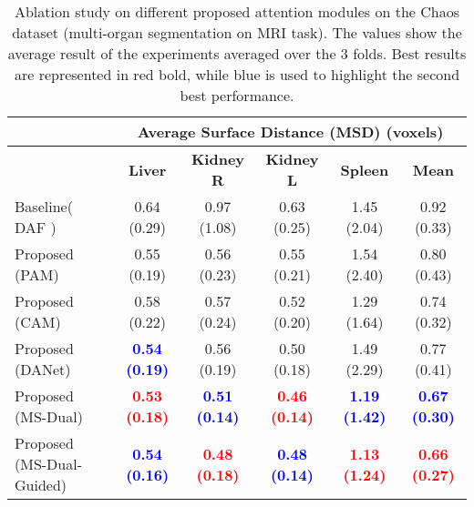 \documentclass[journal]{IEEEtran}
\begin{document}
\begin{table*}[ht!]
\begin{tabular}{lcccc|c}
\midrule
& \multicolumn{5}{c}{\textbf{Average Surface Distance (MSD)} (voxels)}\\
 \midrule
 & \textbf{Liver} & \textbf{Kidney R} & \textbf{Kidney L} & \textbf{Spleen} & \textbf{Mean}  \\
 \midrule
Baseline( DAF \cite{wang18d})  & 0.64 (0.29) & 0.97 (1.08) & 0.63 (0.25)& 1.45 (2.04)&  0.92 (0.33)  \\
Proposed (PAM)     & 0.55 (0.19)& 0.56 (0.23)& 0.55 (0.21)& 1.54 (2.40)&  0.80 (0.43) \\
Proposed (CAM)     &  0.58 (0.22)& 0.57 (0.24)& 0.52 (0.20)& 1.29 (1.64)  & 0.74 (0.32)\\
Proposed (DANet) & \textcolor{blue}{\textbf{0.54 (0.19)}}  &0.56 (0.19) & 0.50 (0.18)& 1.49 (2.29)&   0.77 (0.41) \\
Proposed (MS-Dual)  & \textcolor{red}{\textbf{0.53 (0.18)}}  & \textcolor{blue}{\textbf{0.51 (0.14)}}&  \textcolor{red}{\textbf{0.46 (0.14)}} & \textcolor{blue}{\textbf{1.19 (1.42)}} &  \textcolor{blue}{\textbf{0.67 (0.30)}}\\
Proposed (MS-Dual-Guided)  & \textcolor{blue}{\textbf{0.54 (0.16)}}  & \textcolor{red}{\textbf{0.48 (0.18)}}&  \textcolor{blue}{\textbf{0.48 (0.14)}} & \textcolor{red}{\textbf{1.13 (1.24)}} &  \textcolor{red}{\textbf{0.66 (0.27)}}\\
\midrule



\midrule
\end{tabular}
\caption{Ablation study on different proposed attention modules on the Chaos dataset (multi-organ segmentation on MRI task). The values show the average result of the experiments averaged over the 3 folds. Best results are represented in red bold, while blue is used to highlight the second best performance.}
\label{table:metrics_ablation_supplemental}
\end{table*}
\end{document}

